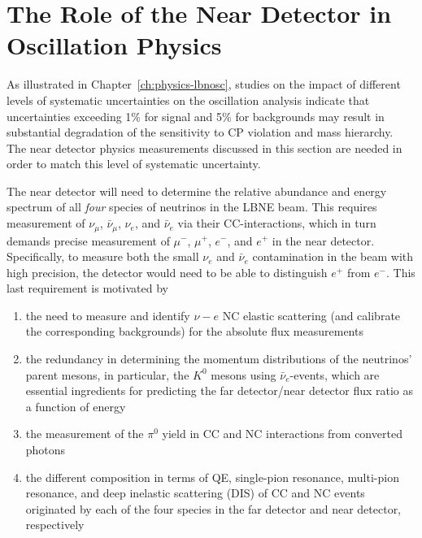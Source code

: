 \section{The Role of the Near Detector in Oscillation Physics} 
\label{sec-nd-oscl} 

As illustrated in Chapter~\ref{ch:physics-lbnosc}, studies on the
impact of different levels of systematic uncertainties on the
oscillation analysis indicate that uncertainties exceeding 1\% for
signal and 5\% for backgrounds may result in substantial degradation
of the sensitivity to CP violation and mass hierarchy.
The near detector physics measurements discussed in this section are
needed in order to match this level of systematic uncertainty.

The near detector will need to determine the relative abundance and
energy spectrum of all \textit{four} species of neutrinos in the LBNE
beam.
%
This requires measurement of $\nu_\mu$, $\bar \nu_\mu$, $\nu_e$, and
$\bar \nu_e$ via their CC-interactions, which in turn demands precise
measurement of $\mu^-$, $\mu^+$, $e^-$, and $e^+$ in the near
detector. Specifically, to measure both the small $\nu_e$ and $\bar
\nu_e$ contamination in the beam with high precision, the detector
would need to be able to distinguish $e^+$ from $e^-$.  This last
requirement is motivated by
\begin{enumerate}
\item the need to measure and identify $\nu - e$ NC elastic scattering
  (and calibrate the corresponding backgrounds) for the absolute flux
  measurements
\item the redundancy in determining the momentum distributions of the
  neutrinos' parent mesons, in particular, the $K^0$ mesons using $\bar
  \nu_e$-events, which are essential ingredients for predicting the
  far detector/near detector flux ratio as a function of energy
\item the measurement of the $\pi^0$ yield in CC and NC interactions 
from converted photons
\item the different composition in terms of QE, single-pion resonance,
  multi-pion resonance, and deep inelastic scattering (DIS) of CC and
  NC events originated by each of the four species in the far detector
  and near detector, respectively
\end{enumerate}


